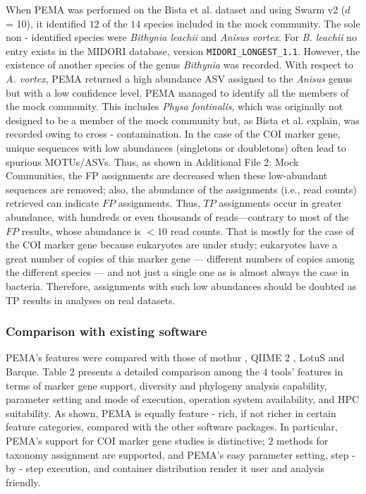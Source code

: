    When PEMA was performed on the Bista et al. dataset \citep{bista2018performance} and using Swarm v2 ($d$ = 10), it identified $12$ of the $14$ species included in the mock community. 
   The sole non - identified species were \textit{Bithynia leachii} and \textit{Anisus vortex}. For \textit{B. leachii} no entry exists in the MIDORI database, version \texttt{MIDORI\_LONGEST\_1.1}. 
   However, the existence of another species of the genus \textit{Bithynia} was recorded. 
   With respect to \textit{A. vortex}, PEMA returned a high abundance ASV assigned to the \textit{Anisus} genus but with a low confidence level. 
   PEMA managed to identify all the members of the mock community. 
   This includes \textit{Physa fontinalis}, which was originally not designed to be a member of the mock community but, as Bista et al. \citep{bista2018performance} explain, was recorded owing to cross - contamination. 
   In the case of the COI marker gene, unique sequences with low abundances (singletons or doubletons) often lead to spurious MOTUs/ASVs. 
   Thus, as shown in Additional File 2: Mock Communities, the FP assignments are decreased when these low-abundant sequences are removed; 
   also, the abundance of the assignments (i.e., read counts) retrieved can indicate $FP$ assignments. 
   Thus, $TP$ assignments occur in greater abundance, with hundreds or even thousands of reads—contrary to most of the $FP$ results, whose abundance is $<10$ read counts. 
   That is mostly for the case of the COI marker gene because eukaryotes are under study; 
   eukaryotes have a great number of copies of this marker gene — different numbers of copies among the different species — and not just a single one as is almost always the case in bacteria. 
   Therefore, assignments with such low abundances should be doubted as TP results in analyses on real datasets.



   \subsubsection*{Comparison with existing software}

   PEMA's features were compared with those of mothur \citep{schloss2009introducing}, QIIME 2 \citep{bolyen2018qiime}, LotuS \citep{hildebrand2014lotus} and Barque. 
   Table 2 presents a detailed comparison among the $4$ tools' features in terms of marker gene support, diversity and phylogeny analysis capability, parameter setting and mode of execution, operation system availability, and HPC suitability. 
   As shown, PEMA is equally feature - rich, if not richer in certain feature categories, compared with the other software packages. In particular, PEMA's support for COI marker gene studies is distinctive; 
   $2$ methods for taxonomy assignment are supported, and PEMA's easy parameter setting, step - by - step execution, and container distribution render it user and analysis friendly.

